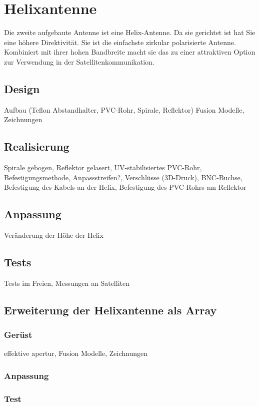 \chapter{Helixantenne}
Die zweite aufgebaute Antenne ist eine Helix-Antenne. Da sie gerichtet ist hat Sie eine höhere Direktivität. Sie ist die einfachste zirkular polarisierte Antenne. Kombiniert mit ihrer hohen Bandbreite macht sie das zu einer attraktiven Option zur Verwendung in der Satellitenkommunikation.

\section{Design}
Aufbau (Teflon Abstandhalter, PVC-Rohr, Spirale, Reflektor) Fusion Modelle, Zeichnungen

\section{Realisierung}
Spirale gebogen, Reflektor gelasert, UV-stabilisiertes PVC-Rohr, Befestigungsmethode, Anpassstreifen?, Verschlüsse (3D-Druck), BNC-Buchse, Befestigung des Kabels an der Helix, Befestigung des PVC-Rohrs am Reflektor

\section{Anpassung}
Veränderung der Höhe der Helix

\section{Tests}
Tests im Freien, Messungen an Satelliten

\section{Erweiterung der Helixantenne als Array}

\subsection{Gerüst}
effektive apertur, Fusion Modelle, Zeichnungen

\subsection{Anpassung}

\subsection{Test}